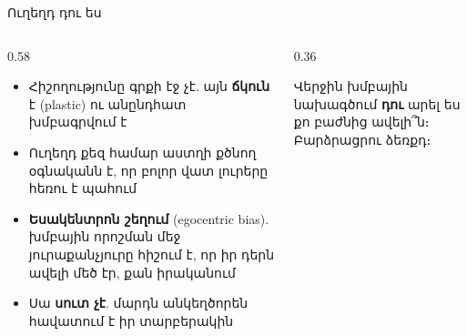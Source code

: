 
\begin{frame}{Ուղեղդ դու ես}
  \begin{columns}[c]
    \begin{column}{0.58\textwidth}
      \begin{itemize}
        \item Հիշողությունը գրքի էջ չէ. այն \textbf{ճկուն} է (plastic) ու անընդհատ խմբագրվում է
        \item Ուղեղդ քեզ համար աստղի քծնող օգնականն է, որ բոլոր վատ լուրերը հեռու է պահում
        \item<2-> \textbf{Եսակենտրոն շեղում} (egocentric bias). խմբային որոշման մեջ յուրաքանչյուրը հիշում է, որ իր դերն ավելի մեծ էր, քան իրականում
        \item<3-> Սա \textbf{սուտ չէ}. մարդն անկեղծորեն հավատում է իր տարբերակին
      \end{itemize}
    \end{column}
    \begin{column}{0.36\textwidth}
      \begin{poll}
        Վերջին խմբային նախագծում \textbf{դու} արել ես քո բաժնից ավելի՞ն։ Բարձրացրու ձեռքդ։
      \end{poll}
    \end{column}
  \end{columns}
\end{frame}

